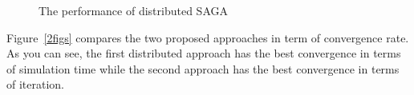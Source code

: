 \documentclass[a4paper,10pt]{article}
\begin{document}
\begin{figure}[ht]
	\centering
	 \hspace{0pt}
	 \hspace{0pt}
	\caption{The performance of distributed SAGA }
	\label{3figs}
\end{figure}

Figure~\ref{2figs} compares the two proposed approaches in term of convergence
rate. As you can see, the first distributed approach has the best convergence in
terms of simulation time while the second approach has the best convergence in
terms of iteration.
\end{document}
